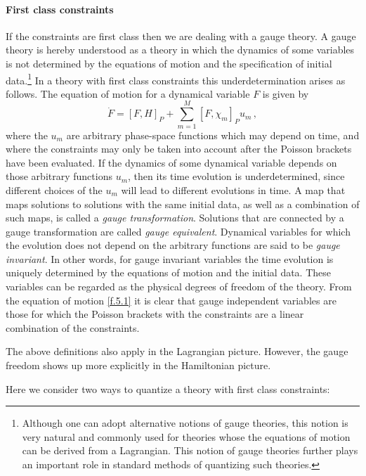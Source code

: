 \documentclass[12pt]{article}
\begin{document}
\paragraph{First class constraints}
If the constraints are first class then we are dealing with a gauge theory. A gauge theory is hereby understood as a theory in which the dynamics of some variables is not determined by the equations of motion and the specification of initial data.{\footnote{Although one can adopt alternative notions of gauge theories, this notion is very natural and commonly used for theories whose the equations of motion can be derived from a Lagrangian. This notion of gauge theories further plays an important role in standard methods of quantizing such theories.}} In a theory with first class constraints this underdetermination arises as follows. The equation of motion for a dynamical variable $F$ is given by
\begin{equation}
\dot{F} = [F,H]_P +\sum^M_{m=1}  [F,\chi_m]_P u_m\,,
\label{f.5.1}
\end{equation}
where the $u_m$ are arbitrary phase-space functions which may depend on time, and where the constraints may only be taken into account after the Poisson brackets have been evaluated. If the dynamics of some dynamical variable depends on those arbitrary functions $u_m$, then its time evolution is underdetermined, since different choices of the $u_m$ will lead to different evolutions in time. A map that maps solutions to solutions with the same initial data, as well as a combination of such maps, is called a {\em gauge transformation}. Solutions that are connected by a gauge transformation are called  {\em gauge equivalent}. Dynamical variables for which the evolution does not depend on the arbitrary functions are said to be {\em gauge invariant}. In other words, for gauge invariant variables the time evolution is uniquely determined by the equations of motion and the initial data.  These variables can be regarded as the physical degrees of freedom of the theory. From the equation of motion \eqref{f.5.1} it is clear that gauge independent variables are those for which the Poisson brackets with the constraints are a linear combination of the constraints.

The above definitions also apply in the Lagrangian picture. However, the gauge freedom shows up more explicitly in the Hamiltonian picture. 

Here we consider two ways to quantize a theory with first class constraints:
\end{document}
